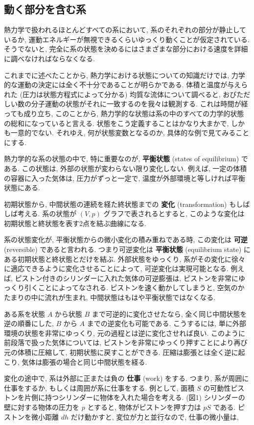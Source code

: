 \subsection*{動く部分を含む系}
熱力学で扱われるほとんどすべての系において, 系のそれぞれの部分が静止しているか, 運動エネルギーが無視できるくらいゆっくり動くことが仮定されている. そうでないと, 完全に系の状態を決めるにはさまざまな部分における速度を詳細に調べなければならなくなる. \par
これまでに述べたことから, 熱力学における状態についての知識だけでは, 力学的な運動の決定には全く不十分であることが明らかである. 体積と温度が与えられた (圧力は状態方程式によって分かる) 均質な流体について調べると, おびただしい数の分子運動の状態がそれに一致するのを我々は観測する. これは時間が経っても成り立ち, このことから, 熱力学的な状態は系の中のすべての力学的状態の総和になっていると言える. 状態をこう定義することはかなり大まかで, しかも一意的でない. それゆえ, 何が状態変数となるのか, 具体的な例で見てみることにする. \par
熱力学的な系の状態の中で, 特に重要なのが, \textbf{平衡状態} (states of equilibrium) である. この状態は, 外部の状態が変わらない限り変化しない. 例えば, 一定の体積の容器に入った気体は, 圧力がずっと一定で, 温度が外部環境と等しければ平衡状態にある. \par
初期状態から, 中間状態の連続を経た終状態までの \textbf{変化} (transformation) もしばしば考える. 系の状態が $(V,p)$ グラフで表されるとすると, このような変化は初期状態と終状態を表す2点を結ぶ曲線になる.\par
系の状態変化が, 平衡状態からの微小変化の積み重ねである時, この変化は \textbf{可逆} (reversible) であると言われる. つまり可逆変化は \textbf{平衡状態} (equilibrium state) にある初期状態と終状態とだけを結ぶ. 外部状態をゆっくり, 系がその変化に徐々に適応できるように変化させることによって, 可逆変化は実現可能となる. 例えば, ピストン付きのシリンダーに入れた気体の可逆膨張は, ピストンを非常にゆっくり引くことによってなされる. ピストンを速く動かしてしまうと, 空気のかたまりの中に流れが生まれ, 中間状態はもはや平衡状態ではなくなる.\par
ある系を状態 $A$ から状態 $B$ まで可逆的に変化させたなら, 全く同じ中間状態を逆の順番にした, $B$ から $A$ までの逆変化も可能である. こうするには, 単に外部環境の状態を非常にゆっくり, 元の過程とは逆に変化させれば良い. このように前段落で扱った気体については, ピストンを非常にゆっくり押すことにより再び元の体積に圧縮して, 初期状態に戻すことができる. 圧縮は膨張とは全く逆に起こり, 気体は膨張の場合と同じ中間状態を経る. \par
変化の途中で, 系は外部に正または負の \textbf{仕事} (work) をする. つまり, 系が周囲に仕事をするか, もしくは周囲が系に仕事をする. 例として, 面積 $S$ の可動性ピストンを片側に持つシリンダーに物体を入れた場合を考える. (図1) シリンダーの壁に対する物体の圧力を $p$ とすると, 物体がピストンを押す力は $pS$ である. ピストンを微小距離 $dh$ だけ動かすと, 変位が力と並行なので, 仕事の微小量は, 

